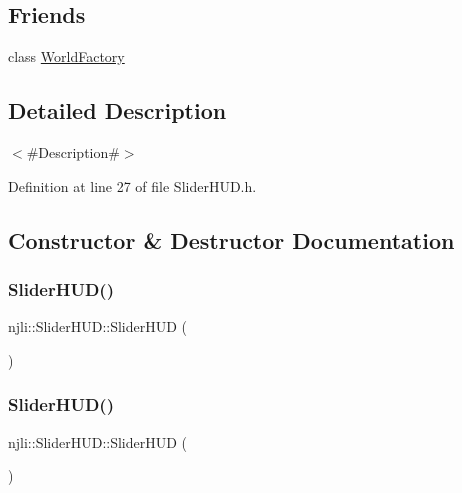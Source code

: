 \subsection*{Friends}
\begin{DoxyCompactItemize}
\item 
class \mbox{\hyperlink{classnjli_1_1_slider_h_u_d_acb96ebb09abe8f2a37a915a842babfac}{World\+Factory}}
\end{DoxyCompactItemize}


\subsection{Detailed Description}
$<$\#\+Description\#$>$ 

Definition at line 27 of file Slider\+H\+U\+D.\+h.



\subsection{Constructor \& Destructor Documentation}
\mbox{\label{classnjli_1_1_slider_h_u_d_a8cc2cb200f5a52bd7f4d5f1520a08524}} 
\subsubsection{\texorpdfstring{Slider\+H\+U\+D()}{SliderHUD()}\hspace{0.1cm}{\footnotesize\ttfamily [1/3]}}
{\footnotesize\ttfamily njli\+::\+Slider\+H\+U\+D\+::\+Slider\+H\+UD (\begin{DoxyParamCaption}{ }\end{DoxyParamCaption})\hspace{0.3cm}{\ttfamily [protected]}}

\mbox{\label{classnjli_1_1_slider_h_u_d_a2ea762c03a7585d4e5c6d2aa3a23692a}} 
\subsubsection{\texorpdfstring{Slider\+H\+U\+D()}{SliderHUD()}\hspace{0.1cm}{\footnotesize\ttfamily [2/3]}}
{\footnotesize\ttfamily njli\+::\+Slider\+H\+U\+D\+::\+Slider\+H\+UD (\begin{DoxyParamCaption}\item[{const \mbox{\hyperlink{classnjli_1_1_abstract_builder}{Abstract\+Builder}} \&}]{ }\end{DoxyParamCaption})\hspace{0.3cm}{\ttfamily [protected]}}

